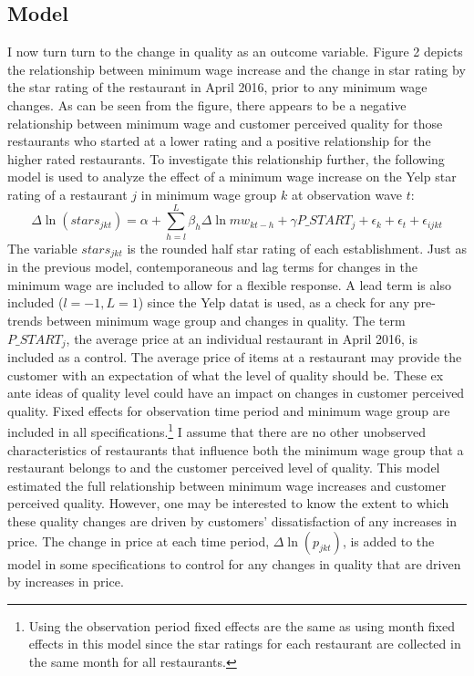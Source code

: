\documentclass[11pt]{article}
\begin{document}
\subsection{Model}
I now turn turn to the change in quality as an outcome variable. Figure 2 depicts the relationship between minimum wage increase and the change in star rating by the star rating of the restaurant in April 2016, prior to any minimum wage changes. As can be seen from the figure, there appears to be a negative relationship between minimum wage and customer perceived quality for those restaurants who started at a lower rating and a positive relationship for the higher rated restaurants. To investigate this relationship further, the following model is used to analyze the effect of a minimum wage increase on the Yelp star rating of a restaurant $j$ in minimum wage group $k$ at observation wave $t$:
\begin{dmath}
\Delta \ln(stars_{jkt}) = \alpha + \sum_{h=l}^{L}\beta_h \Delta \ln mw_{kt-h}  + \gamma  P\_START_{j} + \epsilon_k + \epsilon_t + \epsilon_{ijkt}
\end{dmath}
The variable $stars_{jkt}$ is the rounded half star rating of each establishment. Just as in the previous model, contemporaneous and lag terms for changes in the minimum wage are included to allow for a flexible response. A lead term is also included ($l=-1,L=1$) since the Yelp datat is used, as a check for any pre-trends between minimum wage group and changes in quality. The term $P\_START_j$, the average price at an individual restaurant in April 2016, is included as a control. The average price of items at a restaurant may provide the customer with an expectation of what the level of quality should be. These ex ante ideas of quality level could have an impact on changes in customer perceived quality. Fixed effects for observation time period and minimum wage group are included in all specifications.\footnote{Using the observation period fixed effects are the same as using month fixed effects in this model since the star ratings for each restaurant are collected in the same month for all restaurants.} I assume that there are no other unobserved characteristics of restaurants that influence both the minimum wage group that a restaurant belongs to and the customer perceived level of quality. This model estimated the full relationship between minimum wage increases and customer perceived quality. However, one may be interested to know the extent to which these quality changes are driven by customers' dissatisfaction of any increases in price. The change in price at each time period, $\Delta\ln(p_{jkt})$, is added to the model in some specifications to control for any changes in quality that are driven by increases in price. 
\end{document}
